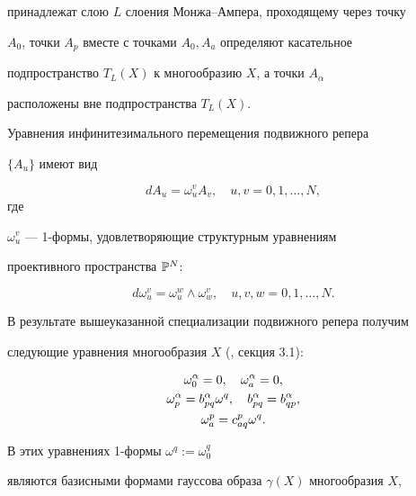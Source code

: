 принадлежат слою $L$ слоения Монжа--Ампера, проходящему через точку


$A_0$, точки $A_p$ вместе с точками $A_0, A_a$ определяют касательное


подпространство $T_L (X)$ к многообразию $X$, а точки $A_\alpha$


расположены вне подпространства $T_L (X)$.





Уравнения инфинитезимального перемещения подвижного репера


$\{A_u\}$ имеют вид


\begin{equation*}




 dA_u = \omega_u^v A_v, \quad u, v = 0, 1, \dotsc , N,
\end{equation*}
где


$\omega_u^v$ --- 1-формы, удовлетворяющие структурным уравнениям


проективного пространства $\Bbb{P}^N$:


\begin{equation*}




d \omega_u^v = \omega_u^w \wedge


\omega_w^v, \quad u, v, w = 0, 1, \dotsc , N.


\end{equation*}



В результате вышеуказанной специализации подвижного репера получим


следующие уравнения многообразия $X$ (\cite{AG04}, секция 3.1):


\begin{gather}




\omega_0^\alpha = 0,\quad 
\omega_a^\alpha = 0,\notag \\
%
\label{eq:5}
\omega_p^\alpha = b_{pq}^\alpha \omega^q, \quad b_{pq}^\alpha =
b_{qp}^\alpha, \\
%
\label{eq:6}
\omega^p_a = c^p_{aq} \omega^q.
\end{gather}



В этих уравнениях 1-формы $\omega^q := \omega_0^q$


являются базисными формами гауссова образа $\gamma (X)$ многообразия $X$,


